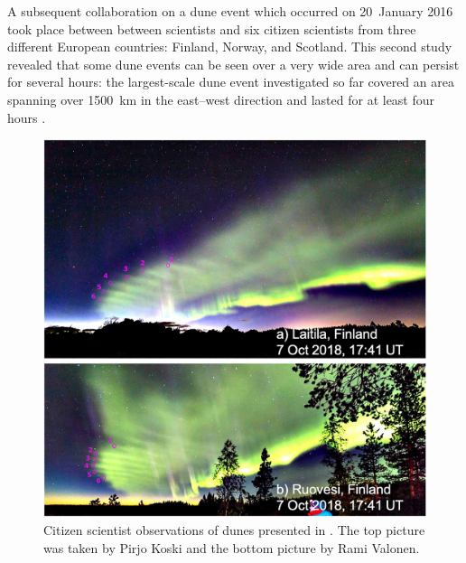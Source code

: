 \documentclass{article}
\renewcommand{\cite}[1]{\parencite{#1}}
\begin{document}
A subsequent collaboration on a dune event which occurred on 20~January 2016 took place between between scientists and six citizen scientists from three different European countries: Finland, Norway, and Scotland. This second study revealed that some dune events can be seen over a very wide area and can persist for several hours: the largest-scale dune event investigated so far covered an area spanning over 1500~km in the east--west direction and lasted for at least four hours \cite{Grandin2021}.
\begin{figure}[h!]
  \includegraphics[width=\linewidth]{Fig8_dunes.jpg}
  \caption{Citizen scientist observations of dunes presented in \textcite{Palmroth2020}. The top picture was taken by Pirjo Koski and the bottom picture by Rami Valonen.}
  \label{fig-duneexample}
\end{figure}
\end{document}

